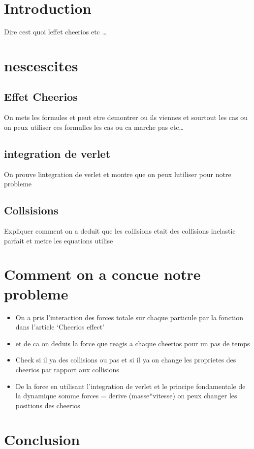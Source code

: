 \documentclass[a4paper, 11pt, oneside]{article} %
\begin{document}
 

\newpage
\section{Introduction}
    Dire cest quoi leffet cheerios etc \ldots

\section{nescescites}
    \subsection{Effet Cheerios}
    On mets les formules et peut etre demontrer ou ils viennes et sourtout les cas ou on peux utiliser ces formulles les cas ou ca marche pas etc\ldots
    \subsection{integration de verlet}
    On prouve lintegration de verlet et montre que on peux lutiliser pour notre probleme
    \subsection{Collsisions}
    Expliquer comment on a deduit que les collisions etait des collisions inelastic parfait et metre les equations utilise

\section{Comment on a concue notre probleme}
    \begin{itemize}
        \item On a pris l'interaction des forces totale sur chaque particule par la fonction dans l'article `Cheerios effect'
        \item et de ca on deduis la force que reagis a chaque cheerios pour un pas de temps 
        \item Check si il ya des collisions ou pas et si il ya on change les proprietes des cheerios par rapport aux collisions
        \item De la force en utilisant l'integration de verlet et le principe fondamentale de la dynamique somme forces = derive (masse*vitesse) on peux changer les positions des cheerios
    \end{itemize}
\section{Conclusion}
\end{document}
